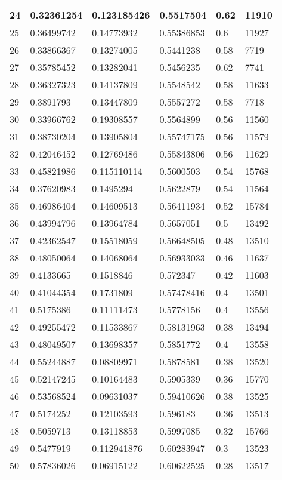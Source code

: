 \begin{longtable}{|l|l|l|l|l|l|}
24 & 0.32361254 & 0.123185426 & 0.5517504 & 0.62 & 11910 \\ \hline 
25 & 0.36499742 & 0.14773932 & 0.55386853 & 0.6 & 11927 \\ \hline 
26 & 0.33866367 & 0.13274005 & 0.5441238 & 0.58 & 7719 \\ \hline 
27 & 0.35785452 & 0.13282041 & 0.5456235 & 0.62 & 7741 \\ \hline 
28 & 0.36327323 & 0.14137809 & 0.5548542 & 0.58 & 11633 \\ \hline 
29 & 0.3891793 & 0.13447809 & 0.5557272 & 0.58 & 7718 \\ \hline 
30 & 0.33966762 & 0.19308557 & 0.5564899 & 0.56 & 11560 \\ \hline 
31 & 0.38730204 & 0.13905804 & 0.55747175 & 0.56 & 11579 \\ \hline 
32 & 0.42046452 & 0.12769486 & 0.55843806 & 0.56 & 11629 \\ \hline 
33 & 0.45821986 & 0.115110114 & 0.5600503 & 0.54 & 15768 \\ \hline 
34 & 0.37620983 & 0.1495294 & 0.5622879 & 0.54 & 11564 \\ \hline 
35 & 0.46986404 & 0.14609513 & 0.56411934 & 0.52 & 15784 \\ \hline 
36 & 0.43994796 & 0.13964784 & 0.5657051 & 0.5 & 13492 \\ \hline 
37 & 0.42362547 & 0.15518059 & 0.56648505 & 0.48 & 13510 \\ \hline 
38 & 0.48050064 & 0.14068064 & 0.56933033 & 0.46 & 11637 \\ \hline 
39 & 0.4133665 & 0.1518846 & 0.572347 & 0.42 & 11603 \\ \hline 
40 & 0.41044354 & 0.1731809 & 0.57478416 & 0.4 & 13501 \\ \hline 
41 & 0.5175386 & 0.11111473 & 0.5778156 & 0.4 & 13556 \\ \hline 
42 & 0.49255472 & 0.11533867 & 0.58131963 & 0.38 & 13494 \\ \hline 
43 & 0.48049507 & 0.13698357 & 0.5851772 & 0.4 & 13558 \\ \hline 
44 & 0.55244887 & 0.08809971 & 0.5878581 & 0.38 & 13520 \\ \hline 
45 & 0.52147245 & 0.10164483 & 0.5905339 & 0.36 & 15770 \\ \hline 
46 & 0.53568524 & 0.09631037 & 0.59410626 & 0.38 & 13525 \\ \hline 
47 & 0.5174252 & 0.12103593 & 0.596183 & 0.36 & 13513 \\ \hline 
48 & 0.5059713 & 0.13118853 & 0.5997085 & 0.32 & 15766 \\ \hline 
49 & 0.5477919 & 0.112941876 & 0.60283947 & 0.3 & 13523 \\ \hline 
50 & 0.57836026 & 0.06915122 & 0.60622525 & 0.28 & 13517 \\ \hline 
\end{longtable}